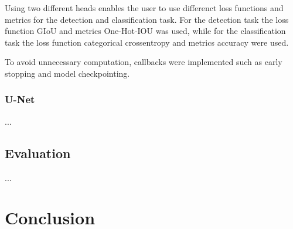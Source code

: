 \documentclass[12pt]{article}
\begin{document}
Using two different heads enables the user to use differenct loss functions and metrics for the detection and classification task. 
For the detection task the loss function GIoU and metrics One-Hot-IOU was used, while for the classification task the loss function categorical crossentropy and metrics accuracy were used.

To avoid unnecessary computation, callbacks were implemented such as early stopping and model checkpointing. 


\subsubsection{U-Net}

...


\subsection{Evaluation}

...


\section{Conclusion}
\end{document}
